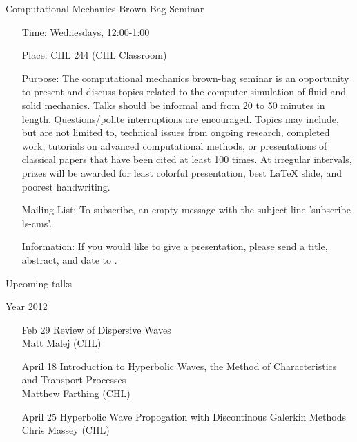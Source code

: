 \documentclass[12]{article}
\begin{document}
\begin{center}
\Large
Computational Mechanics Brown-Bag Seminar
\end{center}

\begin{itemize}
\item[Time:] Wednesdays, 12:00-1:00

\item[Place:] CHL 244 (CHL Classroom)

\item[Purpose:] The computational mechanics brown-bag seminar is an
  opportunity to present and discuss topics related to the computer
  simulation of fluid and solid mechanics. Talks should be informal
  and from 20 to 50 minutes in length. Questions/polite interruptions
  are encouraged. Topics may include, but are not limited to,
  technical issues from ongoing research, completed work, tutorials on
  advanced computational methods, or presentations of classical papers
  that have been cited at least 100 times.  At irregular intervals,
  prizes will be awarded for least colorful presentation, best \LaTeX
  slide, and poorest handwriting.

\item[Mailing List:] To subscribe,  an empty message with the subject line 'subscribe ls-cms'.

\item[Information:] If you would like to give a presentation, please send a title, abstract, and date to .

\end{itemize}


\begin{center}
\Large
Upcoming talks
\end{center}

\begin{center}
\Large
Year 2012
\end{center}

\begin{enumerate}

\item[Feb 29] Review of Dispersive Waves\\
Matt Malej (CHL)\\

\item[April 18] Introduction to Hyperbolic Waves, the Method of Characteristics and Transport Processes\\
Matthew Farthing (CHL)\\

\item[April 25] Hyperbolic Wave Propogation with Discontinous Galerkin Methods\\
Chris Massey (CHL)\\

\end{enumerate}
\end{document}
